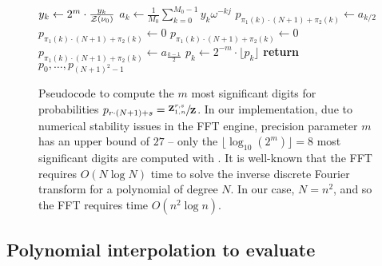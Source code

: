 \begin{figure}[!ht]
\begin{algorithmic}[1]
\State $y_k \gets 2^m \cdot \frac{y_k}{{\mathcal Z}_{}(\nu_0)}$
\EndFor
{}
\State $a_k \gets \frac{1}{M_0} \sum_{k=0}^{M_0-1} y_k \omega^{-kj}$
\EndFor
{}
\State $p_{\pi_1(k) \cdot (N+1) + \pi_2(k)} \gets a_{k/2}$
\Else
\State $p_{\pi_1(k) \cdot (N+1) + \pi_2(k)} \gets 0$
\EndIf
\Else
{}
\State $p_{\pi_1(k) \cdot (N+1) + \pi_2(k)} \gets 0$
\Else
\State $p_{\pi_1(k) \cdot (N+1) + \pi_2(k)} \gets a_{\frac{k-1}{2}}$
\EndIf
\EndIf
\EndFor
{}
\State $p_k \gets 2^{-m} \cdot \lfloor p_k \rfloor$
\EndFor
\State \textbf{return} $p_0,\dots,p_{(N + 1)^2 - 1}$
\EndFunction
\rule[-0.35ex]{0pt}{0pt}
\end{algorithmic}
\caption{
Pseudocode to compute the $m$ most significant digits
for probabilities
$p_{r\cdot(N + 1)+s} = \sfrac{{\bf Z}^{r,s}_{1,n}}{{\bf Z}^{}_{}}$. In our implementation,
due to numerical stability issues in the FFT engine, precision parameter
$m$ has an upper bound of $27$ -- only the $\lfloor \log_{10}(2^m) \rfloor =8$ most significant digits
are computed with \ffttwo. It is well-known that
the FFT requires $O(N \log N)$ time to solve the inverse discrete
Fourier transform for a polynomial of degree $N$. In our case,
$N=n^2$, and so the FFT requires time $O(n^2 \log n)$.
}
\end{figure}

\subsection{Polynomial interpolation to evaluate
\texorpdfstring{}{}}
\label{subsec:ffttwo:fft}

